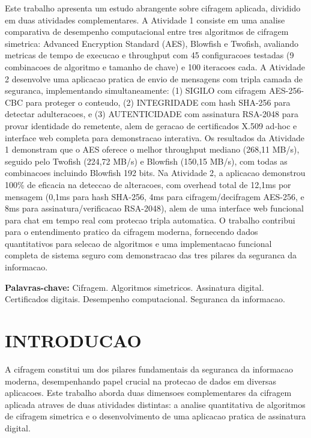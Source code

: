 \documentclass[12pt,a4paper,oneside]{article}
\begin{document}
Este trabalho apresenta um estudo abrangente sobre cifragem aplicada, dividido em duas atividades complementares. A Atividade 1 consiste em uma analise comparativa de desempenho computacional entre tres algoritmos de cifragem simetrica: Advanced Encryption Standard (AES), Blowfish e Twofish, avaliando metricas de tempo de execucao e throughput com 45 configuracoes testadas (9 combinacoes de algoritmo e tamanho de chave) e 100 iteracoes cada. A Atividade 2 desenvolve uma aplicacao pratica de envio de mensagens com tripla camada de seguranca, implementando simultaneamente: (1) SIGILO com cifragem AES-256-CBC para proteger o conteudo, (2) INTEGRIDADE com hash SHA-256 para detectar adulteracoes, e (3) AUTENTICIDADE com assinatura RSA-2048 para provar identidade do remetente, alem de geracao de certificados X.509 ad-hoc e interface web completa para demonstracao interativa. Os resultados da Atividade 1 demonstram que o AES oferece o melhor throughput mediano (268,11 MB/s), seguido pelo Twofish (224,72 MB/s) e Blowfish (150,15 MB/s), com todas as combinacoes incluindo Blowfish 192 bits. Na Atividade 2, a aplicacao demonstrou 100\% de eficacia na deteccao de alteracoes, com overhead total de 12,1ms por mensagem (0,1ms para hash SHA-256, 4ms para cifragem/decifragem AES-256, e 8ms para assinatura/verificacao RSA-2048), alem de uma interface web funcional para chat em tempo real com protecao tripla automatica. O trabalho contribui para o entendimento pratico da cifragem moderna, fornecendo dados quantitativos para selecao de algoritmos e uma implementacao funcional completa de sistema seguro com demonstracao das tres pilares da seguranca da informacao.

\vspace{0.5cm}
\noindent\textbf{Palavras-chave:} Cifragem. Algoritmos simetricos. Assinatura digital. Certificados digitais. Desempenho computacional. Seguranca da informacao.

\newpage
\tableofcontents

\newpage
\section{INTRODUCAO}

A cifragem constitui um dos pilares fundamentais da seguranca da informacao moderna, desempenhando papel crucial na protecao de dados em diversas aplicacoes. Este trabalho aborda duas dimensoes complementares da cifragem aplicada atraves de duas atividades distintas: a analise quantitativa de algoritmos de cifragem simetrica e o desenvolvimento de uma aplicacao pratica de assinatura digital.
\end{document}
